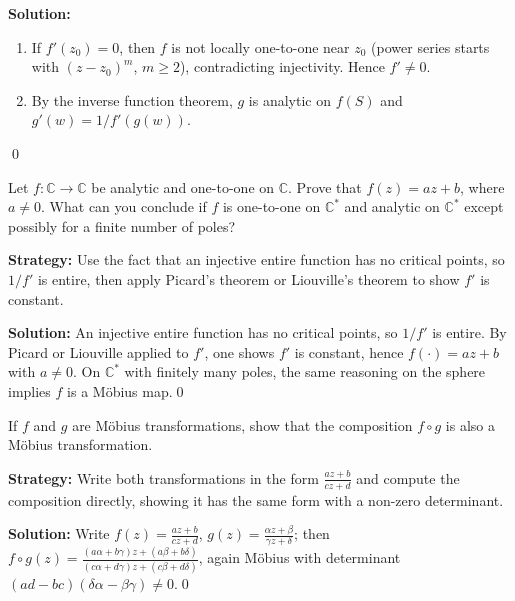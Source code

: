 \bigskip\noindent\textbf{Solution:}
\begin{enumerate}[label=(\alph*)]
\item If $f'(z_0)=0$, then $f$ is not locally one-to-one near $z_0$ (power series starts with $(z-z_0)^m$, $m\ge2$), contradicting injectivity. Hence $f'\ne0$.
\item By the inverse function theorem, $g$ is analytic on $f(S)$ and $g'(w)=1/f'(g(w))$.
\end{enumerate}\qed


\begin{problembox}
Let \( f : \mathbb{C} \to \mathbb{C} \) be analytic and one-to-one on \( \mathbb{C} \). Prove that \( f(z) = a z + b \), where \( a \neq 0 \). What can you conclude if \( f \) is one-to-one on \( \mathbb{C}^* \) and analytic on \( \mathbb{C}^* \) except possibly for a finite number of poles?
\end{problembox}

\noindent\textbf{Strategy:} Use the fact that an injective entire function has no critical points, so \( 1/f' \) is entire, then apply Picard's theorem or Liouville's theorem to show \( f' \) is constant.

\bigskip\noindent\textbf{Solution:}
An injective entire function has no critical points, so $1/f'$ is entire. By Picard or Liouville applied to $f'$, one shows $f'$ is constant, hence $f(\cdot)=a z+b$ with $a\ne0$. On $\mathbb C^*$ with finitely many poles, the same reasoning on the sphere implies $f$ is a Möbius map.\qed


\begin{problembox}
If \( f \) and \( g \) are Möbius transformations, show that the composition \( f \circ g \) is also a Möbius transformation.
\end{problembox}

\noindent\textbf{Strategy:} Write both transformations in the form \( \frac{az+b}{cz+d} \) and compute the composition directly, showing it has the same form with a non-zero determinant.

\bigskip\noindent\textbf{Solution:}
Write $f(z)=\frac{a z+b}{c z+d}$, $g(z)=\frac{\alpha z+\beta}{\gamma z+\delta}$; then \\ $f\circ g(z)=\frac{(a\alpha+b\gamma)z+(a\beta+b\delta)}{(c\alpha+d\gamma)z+(c\beta+d\delta)}$, again Möbius with determinant $(ad-bc)(\delta\alpha-\beta\gamma)\ne0$.\qed


